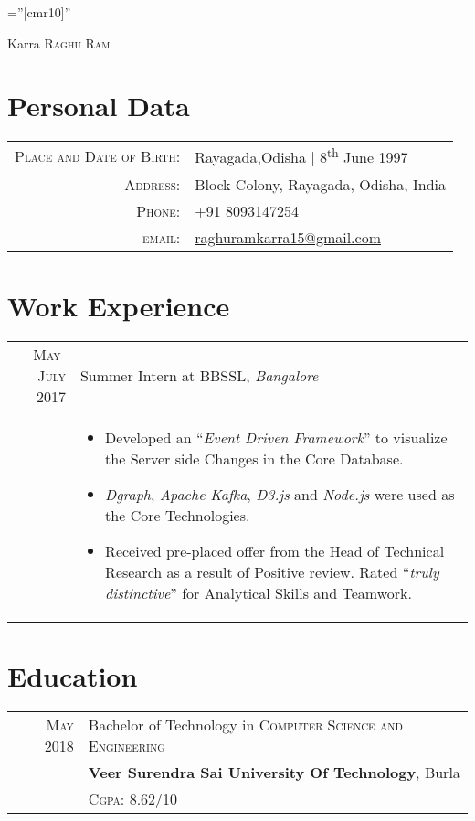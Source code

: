 \documentclass[a4paper,10pt]{article}
\begin{document}
\pagestyle{empty} %

\font\fb=''[cmr10]'' %

\par{\centering
		{\Huge Karra \textsc{Raghu Ram}
	}\bigskip\par}

\section{Personal Data}

\begin{tabular}{rl}
    \textsc{Place and Date of Birth:} & Rayagada,Odisha | 8\textsuperscript{th} June 1997 \\
    \textsc{Address:}   & Block Colony, Rayagada, Odisha, India \\
    \textsc{Phone:}     & +91 8093147254\\
    \textsc{email:}     & \href{raghuramkarra15@gmail.com}{raghuramkarra15@gmail.com}
\end{tabular}

\section{Work Experience}
\begin{tabular}{r|p{11cm}}
\textsc{May-July 2017} & Summer Intern at \textsc{BBSSL}, \emph{Bangalore}\\&\normalsize {
\begin{itemize}
\item Developed an ``\emph{Event Driven Framework}'' to visualize the Server side Changes in the Core Database.
\item \emph{Dgraph}, \emph{Apache Kafka}, \emph{D3.js} and \emph{Node.js} were used as the Core Technologies.
\item Received pre-placed offer from the Head of Technical Research as a result of Positive review. Rated ``\emph{truly distinctive}'' for Analytical Skills and Teamwork.
\end{itemize}
}
\end{tabular}

\section{Education}
\begin{tabular}{rl}	
 \textsc{May} 2018 & Bachelor of Technology in \textsc{Computer Science and Engineering} \\ & \textbf{Veer Surendra Sai University Of Technology}, Burla\\
&\normalsize \textsc{Cgpa}: 8.62/10\\
\end{tabular}
\end{document}
